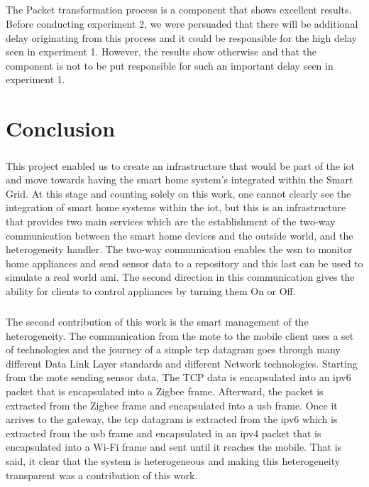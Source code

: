 \documentclass[oneside,12pt,a4paper,final]{book}
\begin{document}
\paragraph{}
 The Packet transformation process is a component that shows excellent results. Before conducting experiment 2, we were persuaded that there will be additional delay originating from this process and it could be responsible for the high delay seen in experiment 1. However, the results show otherwise and that the component is not to be put responsible for such an important delay seen in experiment 1.

\chapter{Conclusion}
\paragraph{}
This project enabled us to create an infrastructure that would be part of the \gls{iot} and move towards having the smart home system's integrated within the Smart Grid. At this stage and counting solely on this work, one cannot clearly see the integration of smart home systems within the \gls{iot}, but this is an infrastructure that provides two main services which are the establishment of the two-way communication between the smart home devices and the outside world, and the heterogeneity handler. The two-way communication enables the \gls{wsn} to monitor home appliances and send sensor data to a repository and this last can be used to simulate a real world \gls{ami}. The second direction in this communication gives the ability for clients to control appliances by turning them On or Off.
\paragraph{}
The second contribution of this work is the smart management of the heterogeneity. The communication from the mote to the mobile client uses a set of technologies and the journey of a simple \gls{tcp} datagram goes through many different Data Link Layer standards and different Network technologies. Starting from the mote sending sensor data, The TCP data is encapsulated into an \gls{ipv6} packet that is encapsulated into a Zigbee frame. Afterward, the packet is extracted from the Zigbee frame and encapsulated into a \gls{usb} frame. Once it arrives to the gateway, the \gls{tcp} datagram is extracted from the \gls{ipv6} which is extracted from the \gls{usb} frame and encapsulated in an \gls{ipv4} packet that is encapsulated into a Wi-Fi frame and sent until it reaches the mobile. That is said, it clear that the system is heterogeneous and making this heterogeneity transparent was a contribution of this work.
\end{document}
